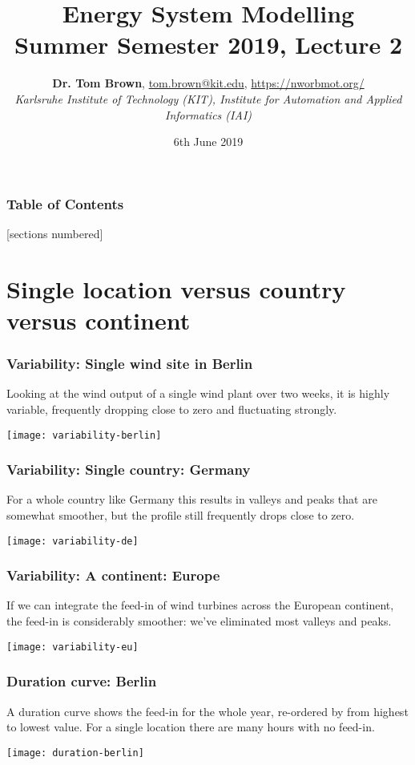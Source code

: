 \documentclass[10pt,aspectratio=169,dvipsnames]{beamer}
\title{Energy System Modelling\\ Summer Semester 2019, Lecture 2}
\author{
  {\bf Dr. Tom Brown}, \href{mailto:tom.brown@kit.edu}{tom.brown@kit.edu}, \url{https://nworbmot.org/}\\
  \emph{Karlsruhe Institute of Technology (KIT), Institute for Automation and Applied Informatics (IAI)}
}
\date{\vspace{.3cm}6th June 2019}
\begin{document}
\maketitle


\begin{frame}

  \frametitle{Table of Contents}
  [sections numbered]
  \tableofcontents[hideallsubsections]
\end{frame}


\section{Single location versus country versus continent}




\begin{frame}
  \frametitle{Variability: Single wind site in Berlin}

  Looking at the wind output of a single wind plant over two weeks, it is highly
  variable, frequently dropping close to zero and fluctuating strongly.

  \centering
  \texttt{[image: variability-berlin]}


\end{frame}



\begin{frame}
  \frametitle{Variability: Single country: Germany}

  For a whole country like Germany this results in valleys and peaks that are  somewhat smoother, but the profile still frequently
  drops close to zero.

  \centering
  \texttt{[image: variability-de]}


\end{frame}



\begin{frame}
  \frametitle{Variability: A continent: Europe}


  If we can integrate the feed-in of wind turbines across the European continent, the
  feed-in is considerably smoother: we've eliminated most valleys and
  peaks.

  \centering
  \texttt{[image: variability-eu]}


\end{frame}


\begin{frame}
  \frametitle{Duration curve: Berlin}

  A \alert{duration curve} shows the feed-in for the whole year, re-ordered by from highest to lowest value. For a single location there are many hours with no feed-in.

  \centering
  \texttt{[image: duration-berlin]}


\end{frame}
\end{document}
